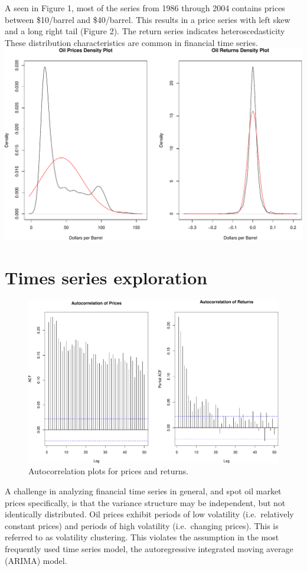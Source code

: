 \documentclass[11pt,]{article}
\begin{document}
A seen in Figure 1, most of the series from 1986 through 2004 contains
prices between \$10/barrel and \$40/barrel. This results in a price
series with left skew and a long right tail (Figure 2). The return
series indicates heteroscedasticity These distribution characteristics
are common in financial time series.
\includegraphics{Figs/unnamed-chunk-5-1.pdf}

\section{Times series exploration}\label{times-series-exploration}

\begin{figure}[htbp]
\centering
\includegraphics{Figs/unnamed-chunk-6-1.pdf}
\caption{Autocorrelation plots for prices and returns.}
\end{figure}

A challenge in analyzing financial time series in general, and spot oil
market prices specifically, is that the variance structure may be
independent, but not identically distributed. Oil prices exhibit periods
of low volatility (i.e.~relatively constant prices) and periods of high
volatility (i.e.~changing prices). This is referred to as volatility
clustering. This violates the assumption in the most frequently used
time series model, the autoregressive integrated moving average (ARIMA)
model.
\end{document}
